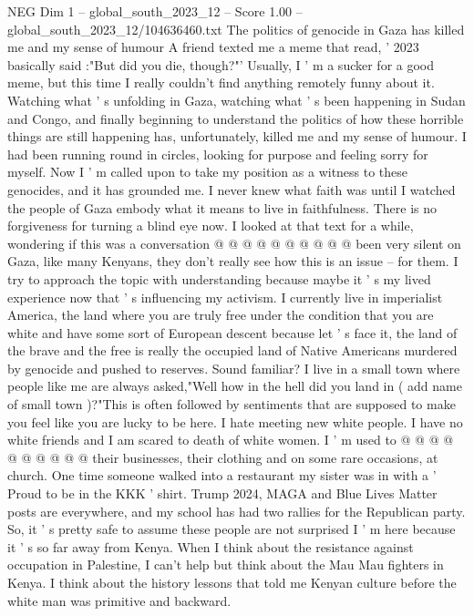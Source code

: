 \begin{textsample}{NEG Dim 1 – global\_south\_2023\_12 – Score 1.00 – global\_south\_2023\_12/104636460.txt}  \label{ex:f1_neg_292}
The politics of genocide in Gaza has killed me and my sense of humour A friend texted me a meme that read, ' 2023 basically said :"But did you die, though?"' Usually, I ' m a sucker for a good meme, but this time I really couldn't find anything remotely funny about it.
Watching what ' s unfolding in Gaza, watching what ' s been happening in Sudan and Congo, and finally beginning to understand the politics of how these horrible things are still happening has, unfortunately, killed me and my sense of humour.
I had been running round in circles, looking for purpose and feeling sorry for myself.
Now I ' m called upon to take my position as a witness to these genocides, and it has grounded me.
I never knew what faith was until I watched the people of Gaza embody what it means to live in faithfulness.
There is no forgiveness for turning a blind eye now.
I looked at that text for a while, wondering if this was a conversation @ @ @ @ @ @ @ @ @ @ been very silent on Gaza, like many Kenyans, they don't really see how this is an issue -- for them.
I try to approach the topic with understanding because maybe it ' s my lived experience now that ' s influencing my activism.
I currently live in imperialist America, the land where you are truly free under the condition that you are white and have some sort of European descent because let ' s face it, the land of the brave and the free is really the occupied land of Native Americans murdered by genocide and pushed to reserves.
Sound familiar?
I live in a small town where people like me are always asked,"Well how in the hell did you land in ( add name of small town )?"This is often followed by sentiments that are supposed to make you feel like you are lucky to be here.
I hate meeting new white people.
I have no white friends and I am scared to death of white women.
I ' m used to @ @ @ @ @ @ @ @ @ @ their businesses, their clothing and on some rare occasions, at church.
One time someone walked into a restaurant my sister was in with a ' Proud to be in the KKK ' shirt.
Trump 2024, MAGA and Blue Lives Matter posts are everywhere, and my school has had two rallies for the Republican party.
So, it ' s pretty safe to assume these people are not surprised I ' m here because it ' s so far away from Kenya.
When I think about the resistance against occupation in Palestine, I can't help but think about the Mau Mau fighters in Kenya.
I think about the history lessons that told me Kenyan culture before the white man was primitive and backward.

\end{textsample}
